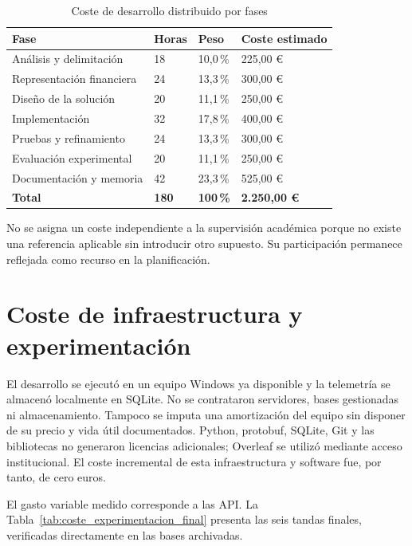\begin{table}[H]
\centering
\small
\caption{Coste de desarrollo distribuido por fases}
\label{tab:coste_desarrollo}
\begin{tabular}{|P{5.3cm}|P{2.0cm}|P{2.5cm}|P{3.0cm}|}
\hline
\textbf{Fase} & \textbf{Horas} & \textbf{Peso} & \textbf{Coste estimado} \\
\hline
Análisis y delimitación & 18 & 10,0\,\% & 225,00 € \\
\hline
Representación financiera & 24 & 13,3\,\% & 300,00 € \\
\hline
Diseño de la solución & 20 & 11,1\,\% & 250,00 € \\
\hline
Implementación & 32 & 17,8\,\% & 400,00 € \\
\hline
Pruebas y refinamiento & 24 & 13,3\,\% & 300,00 € \\
\hline
Evaluación experimental & 20 & 11,1\,\% & 250,00 € \\
\hline
Documentación y memoria & 42 & 23,3\,\% & 525,00 € \\
\hline
\textbf{Total} & \textbf{180} & \textbf{100\,\%} & \textbf{2.250,00 €} \\
\hline
\end{tabular}
\end{table}

No se asigna un coste independiente a la supervisión académica porque no existe una referencia aplicable sin introducir otro supuesto. Su participación permanece reflejada como recurso en la planificación.

\section{Coste de infraestructura y experimentación}
\label{sec:coste_infraestructura_experimentacion}

El desarrollo se ejecutó en un equipo Windows ya disponible y la telemetría se almacenó localmente en SQLite. No se contrataron servidores, bases gestionadas ni almacenamiento. Tampoco se imputa una amortización del equipo sin disponer de su precio y vida útil documentados. Python, protobuf, SQLite, Git y las bibliotecas no generaron licencias adicionales; Overleaf se utilizó mediante acceso institucional. El coste incremental de esta infraestructura y software fue, por tanto, de cero euros.

El gasto variable medido corresponde a las API. La Tabla~\ref{tab:coste_experimentacion_final} presenta las seis tandas finales, verificadas directamente en las bases archivadas.

